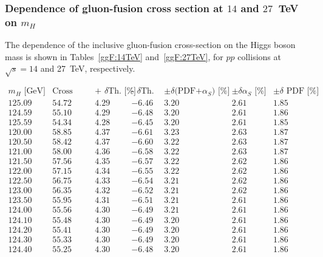 \subsubsection{Dependence of gluon-fusion cross section  at $14$ and $27$~TeV on $m_H$}
\label{sec:ggFmhdep}
The dependence of the inclusive gluon-fusion cross-section on the Higgs boson mass is shown in
Tables~\ref{ggF:14TeV} and~\ref{ggF:27TeV}, for $pp$ collisions at $\sqrt{s}=14$ and 27~TeV, respectively.
\begin{table}[!h]
\begin{center}
\begin{equation}
\begin{array}{|c|c|c|c|c|c|c|}
 \hline
 m_H  \text{ [GeV]}&\text{Cross Section [pb]}&\text{+ $\delta$Th. [\%]}&\text{- $\delta$Th. [\%]}&\pm\delta\text{(PDF+$\alpha_S$) [\%]}& \pm\delta\text{$\alpha_S$ [\%]} & \pm\delta\text{ PDF [\%]}  \\
\hline 
125.09 & 54.72 & 4.29 & -6.46 & 3.20 & 2.61 & 1.85\\
\hline 
124.59 & 55.10 & 4.29 & -6.48 & 3.20 & 2.61 & 1.86\\
\hline 
125.59 & 54.34 & 4.28 & -6.45 & 3.20 & 2.61 & 1.85\\
\hline 
120.00 & 58.85 & 4.37 & -6.61 & 3.23 & 2.63 & 1.87\\
\hline 
120.50 & 58.42 & 4.37 & -6.60 & 3.22 & 2.63 & 1.87\\
\hline 
121.00 & 58.00 & 4.36 & -6.58 & 3.22 & 2.63 & 1.87\\
\hline 
121.50 & 57.56 & 4.35 & -6.57 & 3.22 & 2.62 & 1.86\\
\hline 
122.00 & 57.15 & 4.34 & -6.55 & 3.22 & 2.62 & 1.86\\
\hline 
122.50 & 56.75 & 4.33 & -6.54 & 3.21 & 2.62 & 1.86\\
\hline 
123.00 & 56.35 & 4.32 & -6.52 & 3.21 & 2.62 & 1.86\\
\hline 
123.50 & 55.95 & 4.31 & -6.51 & 3.21 & 2.61 & 1.86\\
\hline 
124.00 & 55.56 & 4.30 & -6.49 & 3.21 & 2.61 & 1.86\\
\hline 
124.10 & 55.48 & 4.30 & -6.49 & 3.20 & 2.61 & 1.86\\
\hline 
124.20 & 55.41 & 4.30 & -6.49 & 3.20 & 2.61 & 1.86\\
\hline 
124.30 & 55.33 & 4.30 & -6.49 & 3.20 & 2.61 & 1.86\\
\hline 
124.40 & 55.25 & 4.30 & -6.48 & 3.20 & 2.61 & 1.86\\

\end{array}
\end{equation}
\end{center}
\end{table}
